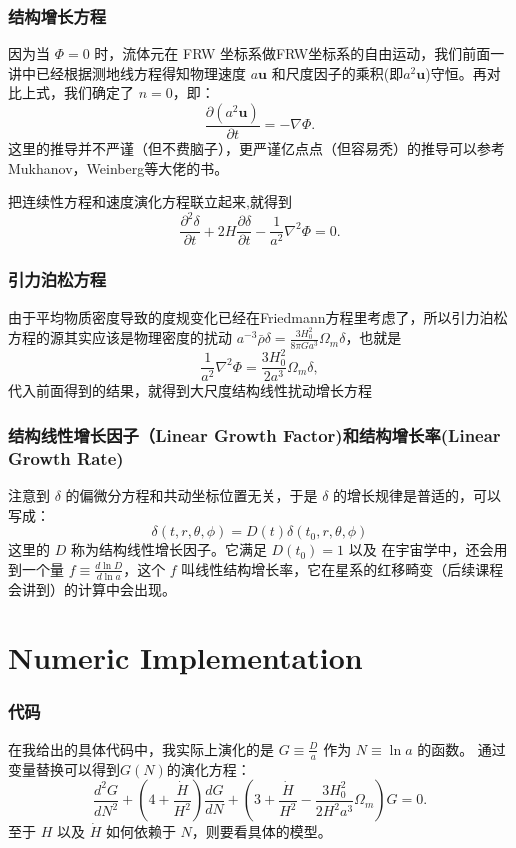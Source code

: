 \documentclass[CJK,13pt]{beamer}
\begin{document}
  \begin{frame}
    \frametitle{结构增长方程}
    因为当 $\Phi=0$ 时，流体元在 FRW 坐标系做FRW坐标系的自由运动，我们前面一讲中已经根据测地线方程得知物理速度 $a\mathbf{u}$ 和尺度因子的乘积(即$a^2\mathbf{u}$)守恒。再对比上式，我们确定了 $n=0$，即：
    {\blue $$\frac{\partial \left(a^2\mathbf{u}\right)}{\partial t} = -\nabla \Phi. $$}
    这里的推导并不严谨（但不费脑子），更严谨亿点点（但容易秃）的推导可以参考 Mukhanov，Weinberg等大佬的书。

    把连续性方程和速度演化方程联立起来,就得到
  $$ \frac{\partial^2 \delta}{\partial t} + 2H\frac{\partial\delta}{\partial t} - \frac{1}{a^2}\nabla^2\Phi =0. $$
  \end{frame}

  \begin{frame}
    \frametitle{引力泊松方程}
    由于平均物质密度导致的度规变化已经在Friedmann方程里考虑了，所以引力泊松方程的源其实应该是物理密度的扰动 $a^{-3}\bar{\rho}\delta = \frac{3H_0^2}{8\pi Ga^3}\Omega_m\delta$，也就是
    $$ \frac{1}{a^2}\nabla^2\Phi = \frac{3H_0^2}{2a^3}\Omega_m\delta,$$
    代入前面得到的结果，就得到{\blue 大尺度结构线性扰动增长方程}
  \end{frame}
    

  \begin{frame}
    \frametitle{结构线性增长因子（Linear Growth Factor)和结构增长率(Linear Growth Rate)}
    注意到 $\delta$ 的偏微分方程和共动坐标位置无关，于是 $\delta$ 的增长规律是普适的，可以写成：
    $$\delta(t, r,\theta,\phi) = D(t) \delta(t_0, r,\theta,\phi) $$
    这里的 $D$ 称为结构线性增长因子。它满足 $D(t_0)=1$ 以及
    在宇宙学中，还会用到一个量 $f \equiv \frac{d\ln D}{d\ln a}$，这个 $f$ 叫线性结构增长率，它在星系的红移畸变（后续课程会讲到）的计算中会出现。    
  \end{frame}


  \section{Numeric Implementation}

  \begin{frame}
    \frametitle{代码}
    在我给出的具体代码中，我实际上演化的是 $G\equiv \frac{D}{a}$ 作为 $N\equiv\ln a$ 的函数。 通过变量替换可以得到$G(N)$的演化方程：
    $$ \frac{d^2G}{dN^2}+\left(4+\frac{\dot H}{H^2}\right)\frac{dG}{dN} + \left(3+\frac{\dot H}{H^2} - \frac{3H_0^2}{2H^2a^3}\Omega_m\right)G = 0.$$
    至于 $H$ 以及 $\dot H$ 如何依赖于 $N$，则要看具体的模型。
  \end{frame}
\end{document}
